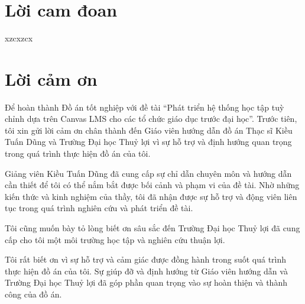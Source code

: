 \documentclass[a4paper,12pt,oneside]{report}
\title{\bf \TITLE}
\author{\AUTHOR}
\theoremstyle{definition}
\begin{document}
\restoregeometry


\chapter*{Lời cam đoan}

xzcxzcx
\newpage

\chapter*{Lời cảm ơn}

Để hoàn thành Đồ án tốt nghiệp với đề tài “Phát triển hệ thống học tập tuỳ chỉnh dựa trên Canvas LMS cho các tổ chức giáo dục trước đại học”. Trước tiên, tôi xin gửi lời cảm ơn chân thành đến Giáo viên hướng dẫn đồ án Thạc sĩ Kiều Tuấn Dũng và Trường Đại học Thuỷ lợi vì sự hỗ trợ và định hướng quan trọng trong quá trình thực hiện đồ án của tôi.

Giảng viên Kiều Tuấn Dũng đã cung cấp sự chỉ dẫn chuyên môn và hướng dẫn cần thiết để tôi có thể nắm bắt được bối cảnh và phạm vi của đề tài. Nhờ những kiến thức và kinh nghiệm của thầy, tôi đã nhận được sự hỗ trợ và động viên liên tục trong quá trình nghiên cứu và phát triển đề tài.

Tôi cũng muốn bày tỏ lòng biết ơn sâu sắc đến Trường Đại học Thuỷ lợi đã cung cấp cho tôi một môi trường học tập và nghiên cứu thuận lợi.

Tôi rất biết ơn vì sự hỗ trợ và cảm giác được đồng hành trong suốt quá trình thực hiện đồ án của tôi. Sự giúp đỡ và định hướng từ Giáo viên hướng dẫn và Trường Đại học Thuỷ lợi đã góp phần quan trọng vào sự hoàn thiện và thành công của đồ án.

\pagestyle{empty} %
\newpage
\tableofcontents %

\listoffigures %

\newpage
\listoftables %

\glsaddall

\newpage
{}
\end{document}
